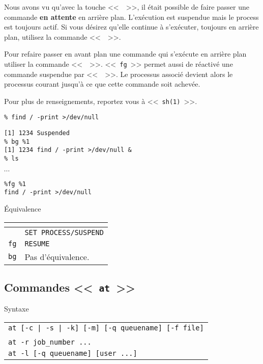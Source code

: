 Nous avons vu qu'avec la touche <<~~>>, il {\'e}tait possible de
faire passer une commande \textbf{en attente} en arri{\`e}re plan. {\large
L'ex{\'e}cution est suspendue mais le process est toujours actif}. Si vous
d{\'e}sirez qu'elle continue {\`a} s'ex{\'e}cuter, toujours en arri{\`e}re plan,
utilisez la commande <<~~>>.

Pour refaire passer en avant plan une commande qui s'ex{\'e}cute en arri{\`e}re
plan utiliser la commande <<~~>>. <<~\texttt{fg}~>>
permet aussi de r{\'e}activ{\'e} une commande suspendue par <<~~>>.
Le processus associ{\'e} devient alors le processus courant jusqu'{\`a} ce que
cette commande soit achev{\'e}e.

Pour plus de renseignements, reportez vous {\`a} <<~\texttt{sh(1)}~>>.

\begin{example}
\begin{verbatim}
% find / -print >/dev/null
\end{verbatim}
\begin{verbatim}
[1] 1234 Suspended
% bg %1
[1] 1234 find / -print >/dev/null &
% ls
\end{verbatim}
$\cdots$\\
\begin{verbatim}
%fg %1
find / -print >/dev/null
\end{verbatim}
\end{example}

\begin{definition}{\'{E}quivalence}
\begin{tabular}{|l|l|}
	\hline
		\multicolumn{1}{|c|}{{\Unix}}	&
		\multicolumn{1}{|c|}{{\OpenVMS}}	\\
	\hline \hline
		\control{Z}	&	{\tt SET PROCESS/SUSPEND}	\\
	\hline
		{\tt fg}		&	{\tt RESUME}				\\
	\hline
		{\tt bg}		&	Pas d'{\'e}quivalence.			\\
	\hline
\end{tabular}
\end{definition}

\subsection{\texorpdfstring{Commandes <<~{\tt at}~>>}{Commandes <<~at~>>}}

\begin{definition}{Syntaxe}
\begin{tabular}{@{\hspace{0.5cm}}l}
	{\tt at [-c | -s | -k] [-m] [-q queuename] [-f file]} \\
	\hspace{1cm}{\tt date [increment] [command | file]}\\[0.2cm]
	{\tt at -r job\_number ...}\\[0.2cm]
	{\tt at -l [-q queuename] [user ...]}\\[0.2cm]
\end{tabular}
\end{definition}

